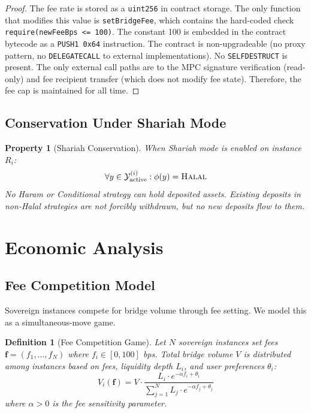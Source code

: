 \documentclass[11pt,twocolumn]{article}
\newtheorem{definition}[theorem]{Definition}
\newtheorem{property}[theorem]{Property}
\theoremstyle{definition}
\newcommand{\Strategy}{\mathcal{Y}}
\newcommand{\halal}{\textsc{Halal}}
\begin{document}
\begin{proof}
The fee rate is stored as a \texttt{uint256} in contract storage. The only function that modifies this value is \texttt{setBridgeFee}, which contains the hard-coded check \texttt{require(newFeeBps <= 100)}. The constant 100 is embedded in the contract bytecode as a \texttt{PUSH1 0x64} instruction. The contract is non-upgradeable (no proxy pattern, no \texttt{DELEGATECALL} to external implementations). No \texttt{SELFDESTRUCT} is present. The only external call paths are to the MPC signature verification (read-only) and fee recipient transfer (which does not modify fee state). Therefore, the fee cap is maintained for all time.
\end{proof}

\subsection{Conservation Under Shariah Mode}

\begin{property}[Shariah Conservation]
\label{prop:shariah-conservation}
When Shariah mode is enabled on instance $R_i$:
\begin{equation}
  \forall y \in \Strategy_{\text{active}}^{(i)}: \phi(y) = \halal
\end{equation}
No Haram or Conditional strategy can hold deposited assets. Existing deposits in non-Halal strategies are not forcibly withdrawn, but no new deposits flow to them.
\end{property}

\section{Economic Analysis}
\label{sec:economics}

\subsection{Fee Competition Model}

Sovereign instances compete for bridge volume through fee setting. We model this as a simultaneous-move game.

\begin{definition}[Fee Competition Game]
\label{def:game}
Let $N$ sovereign instances set fees $\mathbf{f} = (f_1, \ldots, f_N)$ where $f_i \in [0, 100]$ bps. Total bridge volume $V$ is distributed among instances based on fees, liquidity depth $L_i$, and user preferences $\theta_i$:
\begin{equation}
  V_i(\mathbf{f}) = V \cdot \frac{L_i \cdot e^{-\alpha f_i + \theta_i}}{\sum_{j=1}^{N} L_j \cdot e^{-\alpha f_j + \theta_j}}
\end{equation}
where $\alpha > 0$ is the fee sensitivity parameter.
\end{definition}
\end{document}
